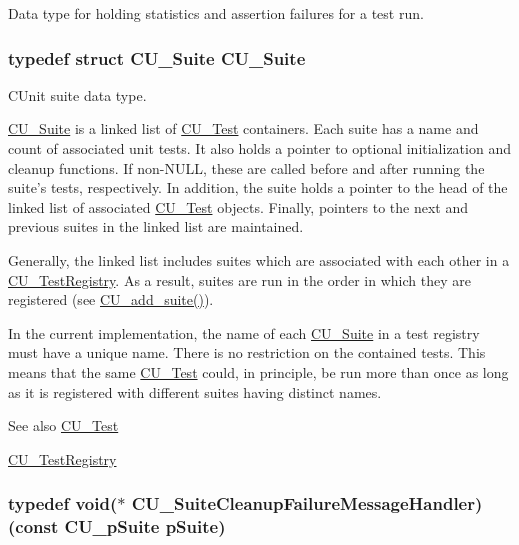 Data type for holding statistics and assertion failures for a test run. 

\hypertarget{group___framework_gad58d2b18d7da9c0ae48ae1679d1b8861}{
\subsubsection[{C\+U\+\_\+\+Suite}]{\setlength{\rightskip}{0pt plus 5cm}typedef struct {\bf C\+U\+\_\+\+Suite}  {\bf C\+U\+\_\+\+Suite}}}\label{group___framework_gad58d2b18d7da9c0ae48ae1679d1b8861}


C\+Unit suite data type. 

\hyperlink{struct_c_u___suite}{C\+U\+\_\+\+Suite} is a linked list of \hyperlink{struct_c_u___test}{C\+U\+\_\+\+Test} containers. Each suite has a name and count of associated unit tests. It also holds a pointer to optional initialization and cleanup functions. If non-\/\+N\+U\+L\+L, these are called before and after running the suite's tests, respectively. In addition, the suite holds a pointer to the head of the linked list of associated \hyperlink{struct_c_u___test}{C\+U\+\_\+\+Test} objects. Finally, pointers to the next and previous suites in the linked list are maintained. 

Generally, the linked list includes suites which are associated with each other in a \hyperlink{struct_c_u___test_registry}{C\+U\+\_\+\+Test\+Registry}. As a result, suites are run in the order in which they are registered (see \hyperlink{group___framework_ga94b8f1bbbd93b154a60bb1d43391b48a}{C\+U\+\_\+add\+\_\+suite()}). 

In the current implementation, the name of each \hyperlink{struct_c_u___suite}{C\+U\+\_\+\+Suite} in a test registry must have a unique name. There is no restriction on the contained tests. This means that the same \hyperlink{struct_c_u___test}{C\+U\+\_\+\+Test} could, in principle, be run more than once as long as it is registered with different suites having distinct names. \begin{DoxySeeAlso}{See also}
\hyperlink{struct_c_u___test}{C\+U\+\_\+\+Test} 

\hyperlink{struct_c_u___test_registry}{C\+U\+\_\+\+Test\+Registry} 
\end{DoxySeeAlso}
\hypertarget{group___framework_ga67a720062975e6b7f97df16a1e8e10ce}{
\subsubsection[{C\+U\+\_\+\+Suite\+Cleanup\+Failure\+Message\+Handler}]{\setlength{\rightskip}{0pt plus 5cm}typedef void($\ast$ C\+U\+\_\+\+Suite\+Cleanup\+Failure\+Message\+Handler)(const {\bf C\+U\+\_\+p\+Suite} p\+Suite)}}\label{group___framework_ga67a720062975e6b7f97df16a1e8e10ce}


